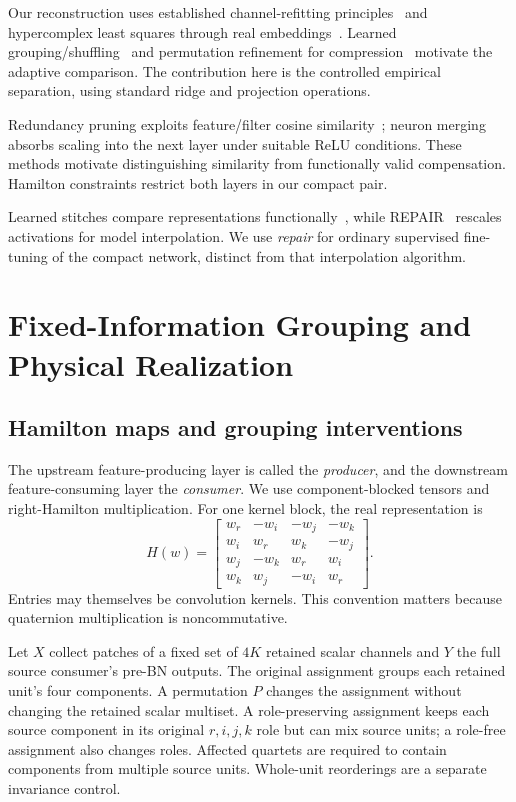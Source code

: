 \documentclass[conference,letterpaper,10pt]{IEEEtran}
\newcommand{\aidraft}{\par\noindent{\footnotesize\textit{AI-assisted drafting}~\cite{OpenAI2026Codex}.}\par}
\begin{document}
Our reconstruction uses established channel-refitting principles~\cite{He2017ChannelPruning} and hypercomplex least squares through real embeddings~\cite{VieiraValle2022ELM}. Learned grouping/shuffling~\cite{Wang2019FLGC,Zhang2021StructuredShuffle} and permutation refinement for compression~\cite{Martinez2021PermuteQuantizeFineTune} motivate the adaptive comparison. The contribution here is the controlled empirical separation, using standard ridge and projection operations.

Redundancy pruning exploits feature/filter cosine similarity~\cite{Ayinde2019}; neuron merging~\cite{Kim2020} absorbs scaling into the next layer under suitable ReLU conditions. These methods motivate distinguishing similarity from functionally valid compensation. Hamilton constraints restrict both layers in our compact pair.

Learned stitches compare representations functionally~\cite{Bansal2021ModelStitching}, while REPAIR~\cite{Jordan2023REPAIR} rescales activations for model interpolation. We use \emph{repair} for ordinary supervised fine-tuning of the compact network, distinct from that interpolation algorithm.

\section{Fixed-Information Grouping and Physical Realization}
\aidraft
\subsection{Hamilton maps and grouping interventions}
The upstream feature-producing layer is called the \emph{producer}, and the downstream feature-consuming layer the \emph{consumer}. We use component-blocked tensors and right-Hamilton multiplication. For one kernel block, the real representation is
\begin{equation}
 H(w)=\begin{bmatrix}
 w_r&-w_i&-w_j&-w_k\\
 w_i&w_r&w_k&-w_j\\
 w_j&-w_k&w_r&w_i\\
 w_k&w_j&-w_i&w_r
 \end{bmatrix}.
 \label{eq:hamilton}
\end{equation}
Entries may themselves be convolution kernels. This convention matters because quaternion multiplication is noncommutative.

Let $X$ collect patches of a fixed set of $4K$ retained scalar channels and $Y$ the full source consumer's pre-BN outputs. The original assignment groups each retained unit's four components. A permutation $P$ changes the assignment without changing the retained scalar multiset. A role-preserving assignment keeps each source component in its original $r,i,j,k$ role but can mix source units; a role-free assignment also changes roles. Affected quartets are required to contain components from multiple source units. Whole-unit reorderings are a separate invariance control.
\end{document}
